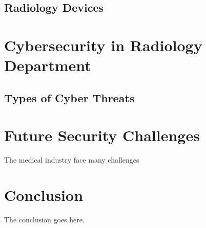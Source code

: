 \documentclass{IEEEtran}
\begin{document}
\subsection{Radiology Devices}

\section{Cybersecurity in Radiology Department}

\subsection{Types of Cyber Threats}

\section{Future Security Challenges}

The medical industry face many challenges 


\section{Conclusion}
The conclusion goes here.







\end{document}
